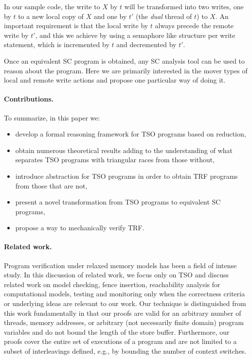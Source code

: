 \documentclass[preprint,9pt]{sigplanconf}
\begin{document}
In our sample code, the write to $X$ by $t$ will be transformed into two writes, one by $t$ to a new local copy of $X$ and one by $t'$ (the {\em dual} thread of $t$) to $X$.
An important requirement is that the local write by $t$ always precede the remote write by $t'$, and this we achieve by using a semaphore like structure per write statement, which is incremented by $t$ and decremented by $t'$. 

Once an equivalent SC program is obtained, any SC analysis tool can be used to reason about the program.
Here we are primarily interested in the mover types of local and remote write actions and propose one particular way of doing it.

\paragraph{Contributions.} 
To summarize, in this paper we:
\begin{itemize}
\item develop a formal reasoning framework for TSO programs based on reduction,
\item obtain numerous theoretical results adding to the understanding of what separates TSO programs with triangular races from those without,
\item introduce abstraction for TSO programs in order to obtain TRF programs from those that are not,
\item present a novel transformation from TSO programs to equivalent SC programs,
\item propose a way to mechanically verify TRF.
\end{itemize}

\paragraph{Related work.}
Program verification under relaxed memory models has been a field of intense study. 
In this discussion of related work, we focus only on TSO and discuss related work on model checking, fence insertion, reachability analysis for computational models, testing and monitoring only when the correctness criteria or underlying ideas are relevant to our work. 
Our technique is distinguished from this work fundamentally in that our proofs are valid for an arbitrary number of threads, memory addresses, or arbitrary (not necessarily finite domain) program variables and do not bound the length of the store buffer. 
Furthermore, our proofs cover the entire set of executions of a program and are not limited to a subset of interleavings defined, e.g., by bounding the number of context switches. 
\end{document}
